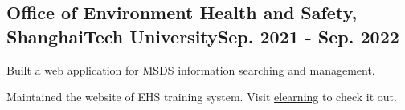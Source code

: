 \documentclass[a4paper,12pt]{article}
\begin{document}
\vspace*{6pt}
\subsection{{Office of Environment Health and Safety, ShanghaiTech University}\hfill Sep. 2021 - Sep. 2022}
\begin{zitemize}
\item Built a web application for MSDS information searching and management.
\item Maintained the website of EHS training system. Visit \href{http://www.techkarma.top/elearning-web/index.html}{elearning} to check it out.
\end{zitemize}
\end{document}
